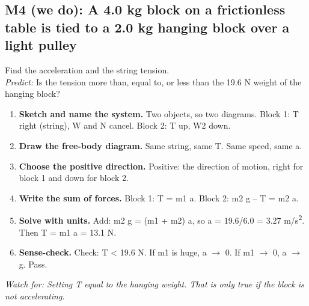 \documentclass[11pt]{article}
\begin{document}
\subsection*{M4 (we do): A 4.0 kg block on a frictionless table is tied to a 2.0 kg hanging block over a light pulley}
Find the acceleration and the string tension.\\ \textit{Predict:} Is the tension more than, equal to, or less than the 19.6 N weight of the hanging block? 
\begin{enumerate}
\item \textbf{Sketch and name the system.} Two objects, so two diagrams. Block 1: T right (string), W and N cancel. Block 2: T up, W2 down.
\item \textbf{Draw the free-body diagram.} Same string, same T. Same speed, same a.
\item \textbf{Choose the positive direction.} Positive: the direction of motion, right for block 1 and down for block 2.
\item \textbf{Write the sum of forces.} Block 1: T = m1 a. Block 2: m2 g -- T = m2 a.
\item \textbf{Solve with units.} Add: m2 g = (m1 + m2) a, so a = 19.6/6.0 = 3.27 m/s\textsuperscript{2}. Then T = m1 a = 13.1 N.
\item \textbf{Sense-check.} Check: T < 19.6 N. If m1 is huge, a $\rightarrow$ 0. If m1 $\rightarrow$ 0, a $\rightarrow$ g. Pass.
\end{enumerate}
 \quad \textit{Watch for: Setting T equal to the hanging weight. That is only true if the block is not accelerating.}\par
\end{document}
